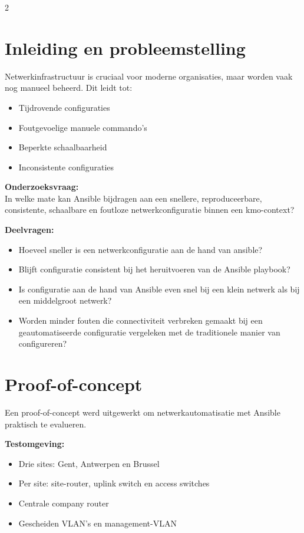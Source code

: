 \documentclass[a0,portrait]{hogent-poster}
\begin{document}
\begin{multicols}{2}

\section{Inleiding en probleemstelling}

Netwerkinfrastructuur is cruciaal voor moderne organisaties, maar worden vaak nog manueel beheerd.
Dit leidt tot:
\begin{itemize}
    \item Tijdrovende configuraties
    \item Foutgevoelige manuele commando's
    \item Beperkte schaalbaarheid
    \item Inconsistente configuraties
\end{itemize}

\textbf{Onderzoeksvraag:}\\
In welke mate kan Ansible bijdragen aan een snellere, reproduceerbare, consistente, schaalbare en foutloze netwerkconfiguratie binnen een kmo-context?

\textbf{Deelvragen:}
\begin{itemize}
    \item Hoeveel sneller is een netwerkconfiguratie aan de hand van ansible?
    \item Blijft configuratie consistent bij het heruitvoeren van de Ansible playbook?
    \item Is configuratie aan de hand van Ansible even snel bij een klein netwerk als bij een middelgroot netwerk?
    \item Worden minder fouten die connectiviteit verbreken gemaakt bij een geautomatiseerde configuratie vergeleken met de traditionele manier van configureren?
\end{itemize}

\section{Proof-of-concept}

Een proof-of-concept werd uitgewerkt om netwerkautomatisatie met Ansible praktisch te evalueren.

\textbf{Testomgeving:}
\begin{itemize}
    \item Drie sites: Gent, Antwerpen en Brussel
    \item Per site: site-router, uplink switch en access switches
    \item Centrale company router
    \item Gescheiden VLAN's en management-VLAN
\end{itemize}


\end{multicols}
\end{document}
